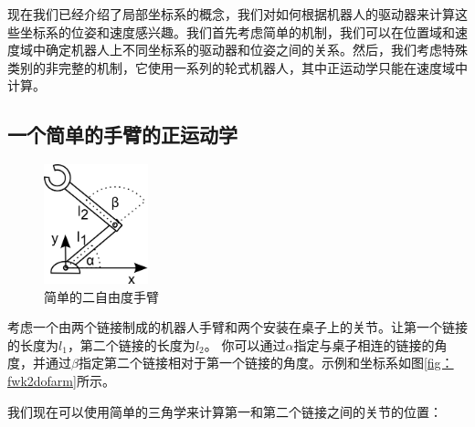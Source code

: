现在我们已经介绍了局部坐标系的概念，我们对如何根据机器人的驱动器来计算这些坐标系的位姿和速度感兴趣。我们首先考虑简单的机制，我们可以在位置域和速度域中确定机器人上不同坐标系的驱动器和位姿之间的关系。然后，我们考虑特殊类别的非完整的机制，它使用一系列的轮式机器人，其中正运动学只能在速度域中计算。

\subsection{一个简单的手臂的正运动学}
\begin{figure}[!htb]%
  \begin{center}
    \includegraphics[width=0.27\textwidth]{figs/fwk2dofarm}
  \end{center}
  \caption{简单的二自由度手臂}
  \label{fig:fwk2dofarm}
\end{figure}


考虑一个由两个链接制成的机器人手臂和两个安装在桌子上的关节。让第一个链接的长度为$l_1$，第二个链接的长度为$l_2$。 你可以通过$\alpha$指定与桌子相连的链接的角度，并通过$\beta$指定第二个链接相对于第一个链接的角度。示例和坐标系如图\ref{fig：fwk2dofarm}所示。


我们现在可以使用简单的三角学来计算第一和第二个链接之间的关节的位置：

